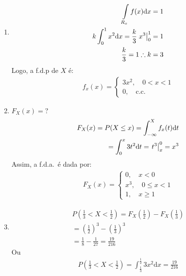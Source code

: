 \begin{example}
         \begin{enumerate}[label=(\alph*)]
           \item 
             \begin{align*}
               \int \limits_{R_x} f(x) \mathrm{d}x =1 \\
               k \int_{0}^{1} x^2 \mathrm{d}x = \frac{k}{3} \left.x^3\right\rvert_{0}^{1} = 1 \\
               \frac{k}{3}=1 \therefore k=3
             \end{align*}
             Logo, a f.d.p de $X$ é:
             \begin{align*}
               f_x(x)= \begin{cases}
                 3x^2, \quad 0<x<1 \\
                 0 , \quad \text{c.c.\ }
               \end{cases}
             \end{align*}
           \item  ${F}_{X} (x)= ?$
             \begin{align*}
               F_{X}(x)= P(X \leq x)= \int_{-\infty}^{X} f_{x} (t) \mathrm{d}t \\
               = \int^{x}_{0} 3 t^2 \mathrm{d}t
               = \left.t^3\right\rvert_{{x}}^{{0}}= x^3
             \end{align*}
             Assim, a f.d.a.\ é dada por:
             \begin{align*}
               F_X(x)= \begin{cases}
                 0 , \quad  x<0\\
                 x^3, \quad 0 \leq x<1 \\
                 1 , \quad x \geq 1 
               \end{cases}
             \end{align*}
           \item 
             \begin{align*}
               P\left( \frac{1}{3}< X < \frac{1}{2} \right)= F_{X} \left(\frac{1}{2}\right) - F_{X} \left(\frac{1}{3}\right)\\
               = \left(\frac{1}{2}\right)^3 - \left(\frac{1}{3}\right)^3 \\
               = \frac{1}{8} - \frac{1}{27} = \frac{19}{216}
             \end{align*}
             Ou 
             \begin{align*}
               P \left( \frac{1}{3} < X < \frac{1}{2} \right)= \int_{\frac{1}{3}}^{\frac{1}{2}} 3x^2 \mathrm{d}x = \frac{19}{216}
             \end{align*}
         \end{enumerate}
       \end{example}

